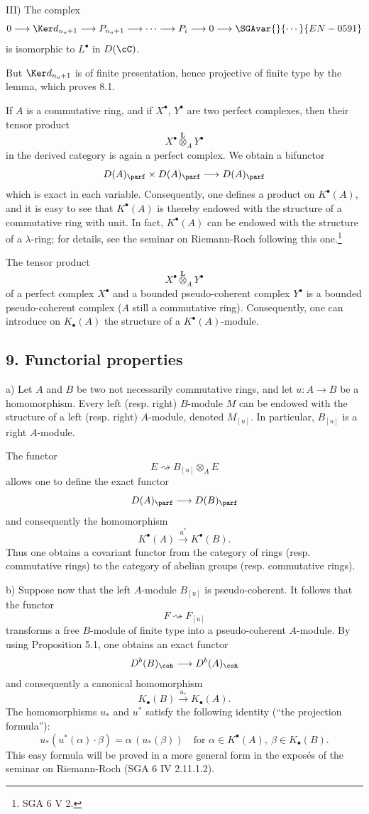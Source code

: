 III) The complex
\[
0\longrightarrow \Ker d_{n_o+1}\longrightarrow P_{n_o+1}\longrightarrow\cdots\longrightarrow P_i\longrightarrow0\longrightarrow\SGAvar{}{\cdots}{EN-0591}
\]
is isomorphic to $L^\bullet$ in $D(\cC)$.

But $\Ker d_{n_o+1}$ is of finite presentation, hence projective of finite type by the lemma, which proves 8.1.

If $A$ is a commutative ring, and if $X^\bullet$, $Y^\bullet$ are two perfect complexes, then their tensor product
\[
X^\bullet\overset{\mathbf L}{\otimes}_A Y^\bullet
\]
in the derived category is again a perfect complex. We obtain a bifunctor
\[
D(A)_{\parf}\times D(A)_{\parf}\longrightarrow D(A)_{\parf}
\]
which is exact in each variable. Consequently, one defines a product on $K^\bullet(A)$, and it is easy to see that $K^\bullet(A)$ is thereby endowed with the structure of a commutative ring with unit. In fact, $K^\bullet(A)$ can be endowed with the structure of a $\lambda$-ring; for details, see the seminar on Riemann-Roch following this one.\footnote{SGA 6 V 2.}

The tensor product
\[
X^\bullet\overset{\mathbf L}{\otimes}_A Y^\bullet
\]
of a perfect complex $X^\bullet$ and a bounded pseudo-coherent complex $Y^\bullet$ is a bounded pseudo-coherent complex ($A$ still a commutative ring). Consequently, one can introduce on $K_\bullet(A)$ the structure of a $K^\bullet(A)$-module.

\subsection*{9. Functorial properties}

a) Let $A$ and $B$ be two not necessarily commutative rings, and let $u:A\to B$ be a homomorphism. Every left (resp. right) $B$-module $M$ can be endowed with the structure of a left (resp. right) $A$-module, denoted $M_{[u]}$. In particular, $B_{[u]}$ is a right $A$-module.

The functor
\[
E\rightsquigarrow B_{[u]}\otimes_A E
\]
allows one to define the exact functor
\[
D(A)_{\parf}\longrightarrow D(B)_{\parf}
\]
and consequently the homomorphism
\[
K^\bullet(A)\xrightarrow{u^*}K^\bullet(B).
\]
Thus one obtains a covariant functor from the category of rings (resp. commutative rings) to the category of abelian groups (resp. commutative rings).

b) Suppose now that the left $A$-module $B_{[u]}$ is pseudo-coherent. It follows that the functor
\[
F\rightsquigarrow F_{[u]}
\]
transforms a free $B$-module of finite type into a pseudo-coherent $A$-module. By using Proposition 5.1, one obtains an exact functor
\[
D^b(B)_{\coh}\longrightarrow D^b(A)_{\coh}
\]
and consequently a canonical homomorphism
\[
K_\bullet(B)\xrightarrow{u_*}K_\bullet(A).
\]
The homomorphisms $u_*$ and $u^*$ satisfy the following identity (``the projection formula''):
\[
u_*(u^*(\alpha)\cdot \beta)=\alpha\,(u_*(\beta))
\quad\text{for }\alpha\in K^\bullet(A),\ \beta\in K_\bullet(B).
\]
This easy formula will be proved in a more general form in the exposés of the seminar on Riemann-Roch (SGA 6 IV 2.11.1.2).

